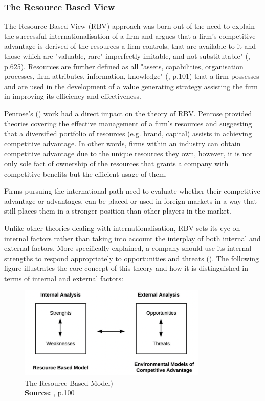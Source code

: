 \documentclass[11pt,a4paper]{article}
\newcommand*{\captionsource}[2]{%
  \caption[{#1}]{%
    #1%
    \\\hspace{\linewidth}%
    \textbf{Source:} #2%
  }%
}
\begin{document}
{{\subsubsection{The Resource Based View}
The Resource Based View (RBV) approach was born out of the need to explain the successful internationalisation of a firm and argues that a firm's competitive advantage is derived of the resources a firm controls, that are available to it and those which are "valuable, rare" imperfectly imitable, and not substitutable" (\cite{barneyResourcebasedViewFirm2001}, p.625). Resources are further defined as all "assets, capabilities, organisation processes, firm attributes, information, knowledge" (\cite{barneyFirmResourcesSustained1991}, p.101) that a firm possesses and are used in the development of a value generating strategy assisting the firm in improving its efficiency and effectiveness.  \par 
Penrose's (\citeyear{penroseTheoryGrowthFirm2009}) work had a direct impact on the theory of RBV.  Penrose provided theories covering the effective management of a firm's resources and suggesting that a diversified portfolio of resources (e.g. brand, capital) assists in achieving competitive advantage. In other words, firms within an industry can obtain competitive advantage due to the unique resources they own, however, it is not only sole fact of ownership of the resources that grants a company with competitive benefits but the efficient usage of them. \par
Firms pursuing the international path need to evaluate whether their competitive advantage or advantages, can be placed or used in foreign markets in a way that still places them in a stronger position than other players in the market. \par
Unlike other theories dealing with internationalisation, RBV sets its eye on internal factors rather than taking into account the interplay of both internal and external factors. More specifically explained, a company should use its internal strengths to respond appropriately to opportunities and threats (\cite{barneyFirmResourcesSustained1991}). The following figure illustrates the core concept of this theory and how it is distinguished in terms of internal and external factors:

  \vspace{5mm}
\begin{figure}[H]
	\centering
  \includegraphics[width=90mm]{figures/fig5_rbv_model}
  \vspace{5mm}
    \captionsetup{justification=centering,margin=2cm}
      \captionsource{The Resource Based Model)}{\cite{barneyFirmResourcesSustained1991}, p.100}
	\label{fig:rbv_model}
\end{figure}

}}
\end{document}
